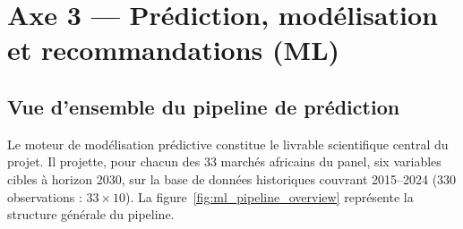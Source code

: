 \documentclass[12pt,a4paper]{report}
\begin{document}
\section{Axe 3 --- Prédiction, modélisation et recommandations (ML)}
\label{sec:ml_pipeline}



\subsection{Vue d'ensemble du pipeline de prédiction}

Le moteur de modélisation prédictive constitue le livrable scientifique central du projet. Il projette, pour chacun des 33 marchés africains du panel, six variables cibles à horizon 2030, sur la base de données historiques couvrant 2015--2024 (330 observations : $33\times10$). La figure~\ref{fig:ml_pipeline_overview} représente la structure générale du pipeline.
\end{document}
